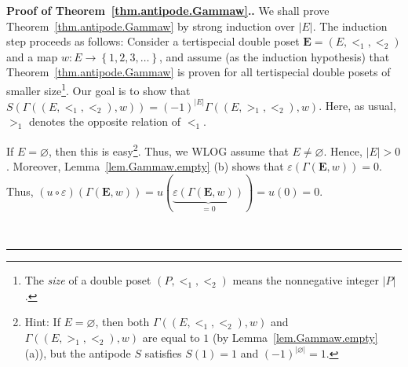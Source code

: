 \documentclass[numbers=enddot,12pt,final,onecolumn,notitlepage,abstracton]{scrartcl}%
\theoremstyle{definition}
\newenvironment{proof}[1][Proof]{\noindent\textbf{#1.} }{\ \rule{0.5em}{0.5em}}
\newcommand{\EE}{{\mathbf{E}}}
\begin{document}
\begin{proof}[Proof of Theorem~\ref{thm.antipode.Gammaw}.]
We shall
prove Theorem~\ref{thm.antipode.Gammaw} by strong induction over
$\left|E\right|$. The induction step proceeds as follows: Consider a
tertispecial double poset $\EE = \left(E, <_1, <_2\right)$ and
a map $w : E \to \left\{1, 2, 3, \ldots\right\}$, and
assume (as the induction hypothesis)
that Theorem~\ref{thm.antipode.Gammaw} is proven for all
tertispecial double posets of smaller size\footnote{The
\textit{size} of a double poset $\left(P, <_1, <_2\right)$
means the nonnegative integer $\left|P\right|$.}.
Our goal
is to show that
$S\left(\Gamma\left(\left(E, <_1, <_2\right), w\right) \right)
= \left(-1\right)^{\left|E\right|}
\Gamma\left(\left(E, >_1, <_2\right), w\right)$.
Here, as usual, $>_1$ denotes the opposite relation of $<_1$.

If $E = \varnothing$, then this is easy\footnote{Hint:
If $E = \varnothing$, then both
$\Gamma\left(\left(E, <_1, <_2\right), w\right)$ and
$\Gamma\left(\left(E, >_1, <_2\right), w\right)$ are equal
to $1$ (by Lemma~\ref{lem.Gammaw.empty} (a)),
but the antipode $S$ satisfies $S\left(1\right) = 1$
and $\left(-1\right)^{\left|\varnothing\right|} = 1$.}.
Thus, we WLOG assume that $E \neq \varnothing$. Hence,
$\left| E \right| > 0$. Moreover,
Lemma~\ref{lem.Gammaw.empty} (b) shows that
$\varepsilon \left( \Gamma\left(\EE, w\right) \right) = 0$. Thus,
$\left( u \circ \varepsilon \right) \left( \Gamma \left( \EE, w \right) \right)
= u \left( \underbrace{\varepsilon \left( \Gamma \left( \EE, w \right) \right)}_{= 0} \right)
= u \left( 0 \right) = 0$.



\end{proof}
\end{document}
